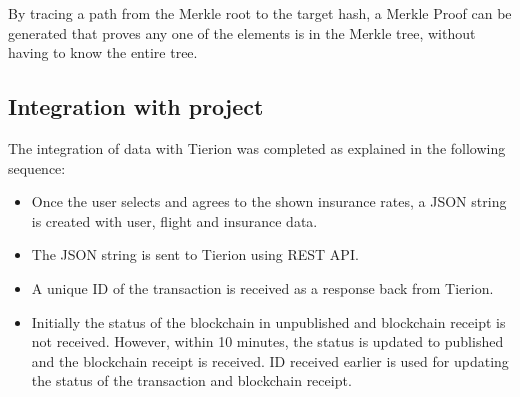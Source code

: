 By tracing a path from the Merkle root to the target hash, a Merkle Proof can be generated that proves any one of the elements is in the Merkle tree, without having to know the entire tree.

\subsection{Integration with project}
The integration of data with Tierion was completed as explained in the following sequence:
\begin{itemize}
    \item Once the user selects and agrees to the shown insurance rates, a JSON string is created with user, flight and insurance data.
    \item The JSON string is sent to Tierion using REST API.
    \item A unique ID of the transaction is received as a response back from Tierion.
    \item Initially the status of the blockchain in unpublished and blockchain receipt is not received. However, within 10 minutes, the status is updated to published and the blockchain receipt is received. ID received earlier is used for updating the status of the transaction and blockchain receipt.
\end{itemize}